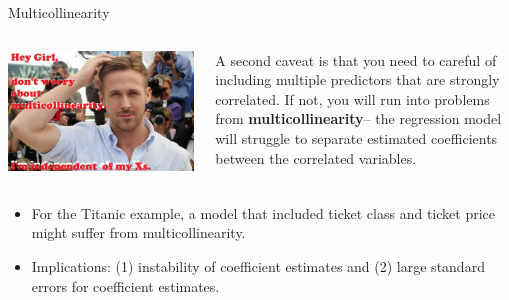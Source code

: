 \documentclass[ignorenonframetext,]{beamer}
\providecommand{\tightlist}{%
  \setlength{\itemsep}{0pt}\setlength{\parskip}{0pt}}
\begin{document}
\begin{frame}{Multicollinearity}

\begin{columns}
\begin{column}{0.5\textwidth}
\includegraphics{images/multicollinearity.jpg}
\end{column}

\begin{column}{0.5\textwidth}
A second caveat is that you need to careful of including multiple predictors that are strongly correlated. If not, you will run into problems from \textbf{multicollinearity}-- the regression model will struggle to separate estimated coefficients between the correlated variables.
\end{column}
\end{columns}

\begin{itemize}
\tightlist
\item
  For the Titanic example, a model that included ticket class and ticket
  price might suffer from multicollinearity.
\item
  Implications: (1) instability of coefficient estimates and (2) large
  standard errors for coefficient estimates.
\end{itemize}

\end{frame}
\end{document}
